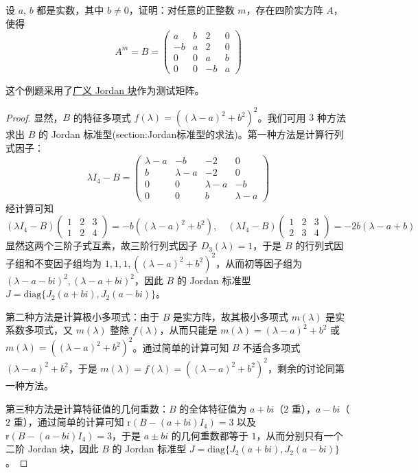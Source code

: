\documentclass[../../main.tex]{subfiles}%
\begin{document}
\begin{example}
设 $a$, $b$ 都是实数，其中 $b\neq 0$，证明：对任意的正整数 $m$，存在四阶实方阵 $A$，使得
\[
A^m = B = 
\begin{pmatrix}
a & b & 2 & 0 \\
-b & a & 2 & 0 \\
0 & 0 & a & b \\
0 & 0 & -b & a
\end{pmatrix}
\]
\end{example}
\begin{remark}
这个例题采用了\hyperref[theorem:实数域上的广义Jordan标准型]{广义 Jordan 块}作为测试矩阵。
\end{remark}
\begin{proof}

显然，$B$ 的特征多项式 $f(\lambda) = ((\lambda - a)^2 + b^2)^2$。我们可用 $3$ 种方法求出 $B$ 的 Jordan 标准型(section:Jordan标准型的求法)。第一种方法是计算行列式因子：
\[
\lambda I_4 - B = 
\begin{pmatrix}
\lambda - a & -b & -2 & 0 \\
b & \lambda - a & -2 & 0 \\
0 & 0 & \lambda - a & -b \\
0 & 0 & b & \lambda - a
\end{pmatrix}
\]
经计算可知
\[
(\lambda I_4 - B)\begin{pmatrix}1&2&3\\1&2&4\end{pmatrix} = -b((\lambda - a)^2 + b^2), \quad (\lambda I_4 - B)\begin{pmatrix}1&2&3\\2&3&4\end{pmatrix} = -2b(\lambda - a + b)
\]
显然这两个三阶子式互素，故三阶行列式因子 $D_3(\lambda) = 1$，于是 $B$ 的行列式因子组和不变因子组均为 $1,1,1,((\lambda - a)^2 + b^2)^2$，从而初等因子组为 $(\lambda - a - bi)^2,(\lambda - a + bi)^2$，因此 $B$ 的 Jordan 标准型 $J = \mathrm{diag}\{J_2(a + bi),J_2(a - bi)\}$。

第二种方法是计算极小多项式：由于 $B$ 是实方阵，故其极小多项式 $m(\lambda)$ 是实系数多项式，又 $m(\lambda)$ 整除 $f(\lambda)$，从而只能是 $m(\lambda) = (\lambda - a)^2 + b^2$ 或 $m(\lambda) = ((\lambda - a)^2 + b^2)^2$。通过简单的计算可知 $B$ 不适合多项式 $(\lambda - a)^2 + b^2$，于是 $m(\lambda) = f(\lambda) = ((\lambda - a)^2 + b^2)^2$，剩余的讨论同第一种方法。

第三种方法是计算特征值的几何重数：$B$ 的全体特征值为 $a + bi$（$2$ 重），$a - bi$（$2$ 重），通过简单的计算可知 $\mathrm{r}(B - (a + bi)I_4) = 3$ 以及 $\mathrm{r}(B - (a - bi)I_4) = 3$，于是 $a\pm bi$ 的几何重数都等于 $1$，从而分别只有一个二阶 Jordan 块，因此 $B$ 的 Jordan 标准型 $J = \mathrm{diag}\{J_2(a + bi),J_2(a - bi)\}$。


\end{proof}
\end{document}
